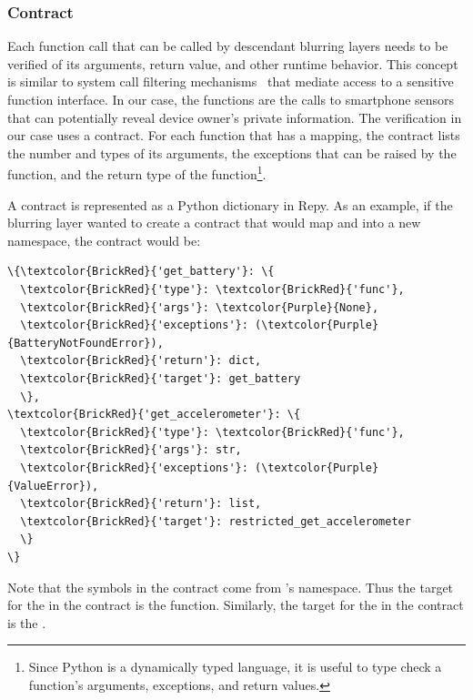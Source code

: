 \subsubsection{Contract}

%
Each function call that can be called by descendant blurring
layers needs to be verified of its arguments, return value, and 
other runtime behavior. This concept is similar to system call filtering
mechanisms~\cite{acharya2000mapbox, fraser2000hardening} 
that mediate access to a sensitive function interface. In our case, 
the functions are the calls to smartphone sensors that 
can potentially reveal device owner's private information. The 
verification in our case uses a contract. For each function that has a 
mapping, the contract lists the number 
and types of its arguments, the exceptions that can be raised 
by the function, and the return type of the function\footnote{\scriptsize 
Since Python is a dynamically typed language, it is useful to type check 
a function's arguments, exceptions, and return values.}.

A contract is represented as a Python dictionary in Repy. As an example, if 
the blurring layer  wanted to create a contract that would map
 and  into 
a new namespace, the contract would be: 

\begin{Verbatim}
\{\textcolor{BrickRed}{'get_battery'}: \{
  \textcolor{BrickRed}{'type'}: \textcolor{BrickRed}{'func'},
  \textcolor{BrickRed}{'args'}: \textcolor{Purple}{None}, 
  \textcolor{BrickRed}{'exceptions'}: (\textcolor{Purple}{BatteryNotFoundError}), 
  \textcolor{BrickRed}{'return'}: dict,
  \textcolor{BrickRed}{'target'}: get_battery
  \}, 
\textcolor{BrickRed}{'get_accelerometer'}: \{
  \textcolor{BrickRed}{'type'}: \textcolor{BrickRed}{'func'},
  \textcolor{BrickRed}{'args'}: str, 
  \textcolor{BrickRed}{'exceptions'}: (\textcolor{Purple}{ValueError}), 
  \textcolor{BrickRed}{'return'}: list,
  \textcolor{BrickRed}{'target'}: restricted_get_accelerometer
  \}
\}
\end{Verbatim} 

Note that the symbols in the contract come from 's 
namespace. Thus the target for the  in the 
contract is the  function. Similarly, the 
target for the  in the contract is the 
.

